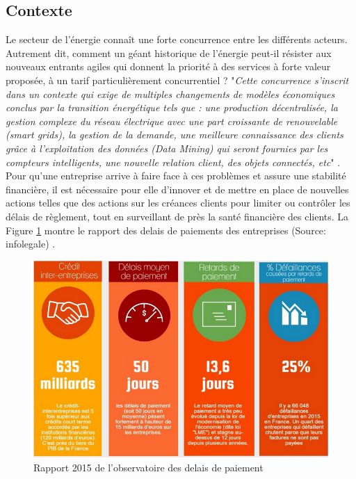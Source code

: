 \documentclass[11pt,a4paper]{report}
\begin{document}
\subsection{Contexte}
Le secteur de l'énergie connaît une forte concurrence entre les différents acteurs. Autrement dit, comment un géant historique de l’énergie peut-il résister aux nouveaux entrants agiles qui donnent la priorité à des services à forte valeur proposée, à un tarif particulièrement concurrentiel ? "\textit{Cette concurrence s'inscrit dans un contexte qui exige de multiples changements de modèles économiques conclus par la transition énergétique tels que : une production décentralisée, la gestion complexe du réseau électrique avec une part croissante de renouvelable (smart grids), la gestion de la demande, une meilleure connaissance des clients grâce à l’exploitation des données (Data Mining) qui seront fournies par les compteurs intelligents, une nouvelle relation client, des objets connectés, etc}" \cite{cap}. 
Pour qu'une entreprise arrive à faire face à ces problèmes et assure une stabilité financière, il est nécessaire pour elle d'innover et de mettre en place de nouvelles actions telles que  des actions sur les créances clients pour limiter ou contrôler les délais de règlement, tout en surveillant de près la santé financière des clients. La Figure  \ref{figure1} montre le rapport des delais de paiements des entreprises (Source: infolegale) \cite{infolegale}.   
\begin{figure}[h]
   \centering
   \includegraphics[scale=0.50]{infolegale.PNG}
      \caption{Rapport 2015 de l'observatoire des delais de
      paiement}
      \label{figure1}
\end{figure}
\end{document}
